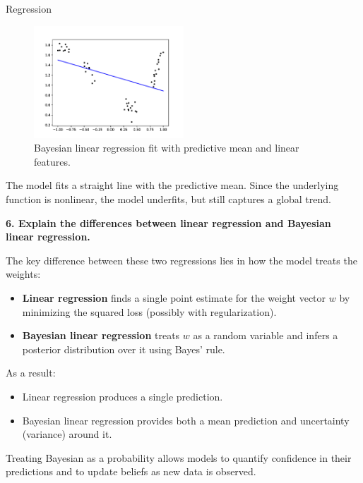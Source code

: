 \documentclass[
	english,
        solution=true
	]{tudaexercise}
\begin{document}
\begin{task}[points=34]{Regression}
\begin{subtask}[points=10, title=Bayesian Linear Regression]
\begin{solution}
            \begin{figure}[H]
                \centering
                \includegraphics[width=0.5\textwidth]{images/Task1c_5.png}
                \caption{Bayesian linear regression fit with predictive mean and linear features.}
            \end{figure}

            The model fits a straight line with the predictive mean.
            Since the underlying function is nonlinear, the model underfits, but still captures a global trend.

            \vspace{2em}

            \textbf{6. Explain the differences between linear regression and Bayesian linear regression.}
        
            The key difference between these two regressions lies in how the model treats the weights:

            \begin{itemize}
                \item \textbf{Linear regression} finds a single point estimate for the weight vector $w$ by minimizing the squared loss (possibly with regularization).
                \item \textbf{Bayesian linear regression} treats $w$ as a random variable and infers a posterior distribution over it using Bayes' rule.
            \end{itemize}

            As a result:
            \begin{itemize}
                \item Linear regression produces a single prediction.
                \item Bayesian linear regression provides both a mean prediction and uncertainty (variance) around it.
            \end{itemize}

            Treating Bayesian as a probability allows models to quantify confidence in their predictions and to update beliefs as new data is observed.
        \end{solution}
    \end{subtask}


\end{task}
\end{document}
